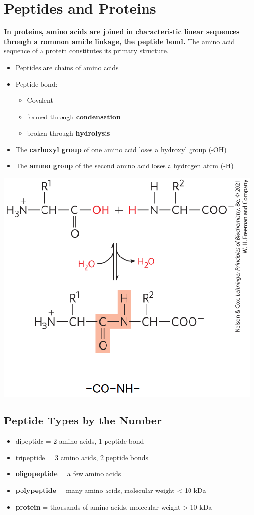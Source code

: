 \documentclass[10pt]{article}
\begin{document}
\section*{Peptides and Proteins}
\textbf{In proteins, amino acids are joined in characteristic linear sequences through a common amide linkage, the peptide bond.}  The amino acid sequence of a protein constitutes its primary structure.
\begin{itemize}
    \item Peptides are chains of amino acids
    \item Peptide bond:
    \begin{itemize}
        \item Covalent
        \item formed through \textbf{condensation}
        \item broken through \textbf{hydrolysis}
    \end{itemize}
    \item The \textbf{carboxyl group} of one amino acid loses a hydroxyl group (-OH)
    \item The \textbf{amino group} of the second amino acid loses a hydrogen atom (-H)
\end{itemize}
\begin{center}
    \includegraphics[width=\textwidth]{L2_9.png}
\end{center}
\subsection*{Peptide Types by the Number}
\begin{itemize}
    \item dipeptide = 2 amino acids, 1 peptide bond
    \item tripeptide = 3 amino acids, 2 peptide bonds
    \item \textbf{oligopeptide} = a few amino acids
    \item \textbf{polypeptide} = many amino acids, molecular weight < 10 kDa
    \item \textbf{protein} = thousands of amino acids, molecular weight > 10 kDa
\end{itemize}
\end{document}
